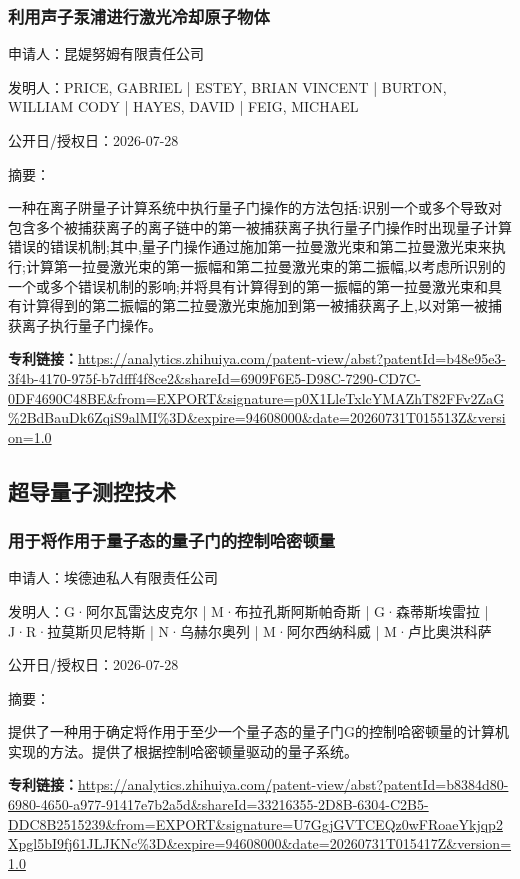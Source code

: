 \documentclass[12pt,a4paper]{ctexart}
\begin{document}
\subsubsection{ 利用声子泵浦进行激光冷却原子物体 }

申请人：昆媞努姆有限責任公司

发明人：PRICE, GABRIEL | ESTEY, BRIAN VINCENT | BURTON, WILLIAM CODY | HAYES, DAVID | FEIG, MICHAEL

公开日/授权日：2026-07-28

摘要：

一种在离子阱量子计算系统中执行量子门操作的方法包括:识别一个或多个导致对包含多个被捕获离子的离子链中的第一被捕获离子执行量子门操作时出现量子计算错误的错误机制;其中,量子门操作通过施加第一拉曼激光束和第二拉曼激光束来执行;计算第一拉曼激光束的第一振幅和第二拉曼激光束的第二振幅,以考虑所识别的一个或多个错误机制的影响;并将具有计算得到的第一振幅的第一拉曼激光束和具有计算得到的第二振幅的第二拉曼激光束施加到第一被捕获离子上,以对第一被捕获离子执行量子门操作。

\noindent\textbf{专利链接：}\url{https://analytics.zhihuiya.com/patent-view/abst?patentId=b48e95e3-3f4b-4170-975f-b7dfff4f8ce2&shareId=6909F6E5-D98C-7290-CD7C-0DF4690C48BE&from=EXPORT&signature=p0X1LleTxlcYMAZhT82FFv2ZaG%2BdBauDk6ZqiS9alMI%3D&expire=94608000&date=20260731T015513Z&version=1.0}


\subsection{ 超导量子测控技术 }

\subsubsection{ 用于将作用于量子态的量子门的控制哈密顿量 }

申请人：埃德迪私人有限责任公司

发明人：G·阿尔瓦雷达皮克尔 | M·布拉孔斯阿斯帕奇斯 | G·森蒂斯埃雷拉 | J·R·拉莫斯贝尼特斯 | N·乌赫尔奥列 | M·阿尔西纳科威 | M·卢比奥洪科萨

公开日/授权日：2026-07-28

摘要：

提供了一种用于确定将作用于至少一个量子态的量子门G的控制哈密顿量的计算机实现的方法。提供了根据控制哈密顿量驱动的量子系统。

\noindent\textbf{专利链接：}\url{https://analytics.zhihuiya.com/patent-view/abst?patentId=b8384d80-6980-4650-a977-91417e7b2a5d&shareId=33216355-2D8B-6304-C2B5-DDC8B2515239&from=EXPORT&signature=U7GgjGVTCEQz0wFRoaeYkjqp2Xpgl5bI9fj61JLJKNc%3D&expire=94608000&date=20260731T015417Z&version=1.0}
\end{document}
